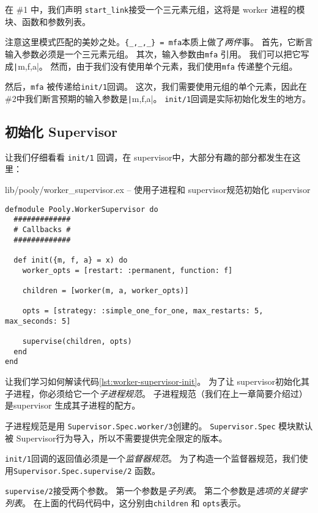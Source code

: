 在 \#1 中，我们声明 \texttt{start\_link}接受一个三元素元组，这将是 worker 进程的模块、函数和参数列表。

注意这里模式匹配的美妙之处。\texttt{\{\_,\_,\_\} = mfa}本质上做了\emph{两件}事。
首先，它断言输入参数必须是一个三元素元组。
其次，输入参数由\texttt{mfa} 引用。
我们可以把它写成\texttt|{m,f,a}|。
然而，由于我们没有使用单个元素，我们使用\texttt{mfa} 传递整个元组。

然后，\texttt{mfa} 被传递给\texttt{init/1}回调。
这次，我们需要使用元组的单个元素，因此在 \#2中我们断言预期的输入参数是\texttt|{m,f,a}|。
\texttt{init/1}回调是实际初始化发生的地方。

\subsection{初始化 Supervisor}

让我们仔细看看 \texttt{init/1} 回调，在 supervisor中，大部分有趣的部分都发生在这里：

\begin{code}{lib/pooly/worker\_supervisor.ex -- 使用子进程和 supervisor规范初始化 supervisor}
\begin{verbatim}
defmodule Pooly.WorkerSupervisor do
  #############
  # Callbacks #
  #############

  def init({m, f, a} = x) do
    worker_opts = [restart: :permanent, function: f]

    children = [worker(m, a, worker_opts)]

    opts = [strategy: :simple_one_for_one, max_restarts: 5, max_seconds: 5]

    supervise(children, opts)
  end
end
\end{verbatim}
\label{lst:worker-supervisor-init}
\end{code}

让我们学习如何解读代码\ref{lst:worker-supervisor-init}。
为了让 supervisor初始化其子进程，你必须给它一个\emph{子进程规范}。
子进程规范（我们在上一章简要介绍过）是supervisor 生成其子进程的配方。

子进程规范是用 \texttt{Supervisor.Spec.worker/3}创建的。
\texttt{Supervisor.Spec} 模块默认被 Supervisor行为导入，所以不需要提供完全限定的版本。

\texttt{init/1}回调的返回值必须是一个\emph{监督器规范}。
为了构造一个监督器规范，我们使用\texttt{Supervisor.Spec.supervise/2} 函数。

\texttt{supervise/2}接受两个参数。
第一个参数是\emph{子列表}。
第二个参数是\emph{选项的关键字列表}。
在上面的代码代码中，这分别由\texttt{children} 和 \texttt{opts}表示。

